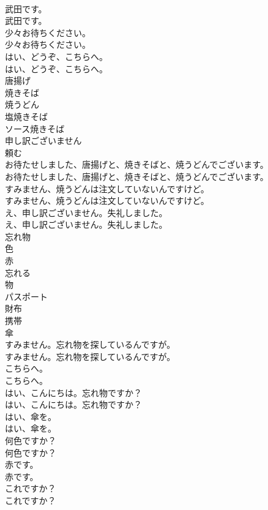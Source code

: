 \documentclass[8pt]{extreport}
\begin{document}
\begin{CJK}{UTF8}{min}
\\	武田です。	
\\	武田です。 
\\	少々お待ちください。	
\\	少々お待ちください。 
\\	はい、どうぞ、こちらへ。	
\\	はい、どうぞ、こちらへ。 
\\	唐揚げ
\\	焼きそば
\\	焼うどん
\\	塩焼きそば
\\	ソース焼きそば
\\	申し訳ございません
\\	頼む
\\	お待たせしました、唐揚げと、焼きそばと、焼うどんでございます。	
\\	お待たせしました、唐揚げと、焼きそばと、焼うどんでございます。 
\\	すみません、焼うどんは注文していないんですけど。	
\\	すみません、焼うどんは注文していないんですけど。 
\\	え、申し訳ございません。失礼しました。	
\\	え、申し訳ございません。失礼しました。 
\\	忘れ物
\\	色
\\	赤
\\	忘れる
\\	物
\\	パスポート
\\	財布
\\	携帯
\\	傘
\\	すみません。忘れ物を探しているんですが。	
\\	すみません。忘れ物を探しているんですが。 
\\	こちらへ。	
\\	こちらへ。 
\\	はい、こんにちは。忘れ物ですか？	
\\	はい、こんにちは。忘れ物ですか？ 
\\	はい、傘を。	
\\	はい、傘を。 
\\	何色ですか？	
\\	何色ですか？ 
\\	赤です。	
\\	赤です。 
\\	これですか？	
\\	これですか？ 

\end{CJK}
\end{document}
